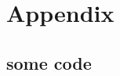 \chapter{Appendix}
\label{sec:appendix}


\newpage
\section{some code} \label{appendix:some-code}
    \inputminted[firstline=5, lastline=30]{python}{./../physics-code/computation-scripts/script.py}
    
